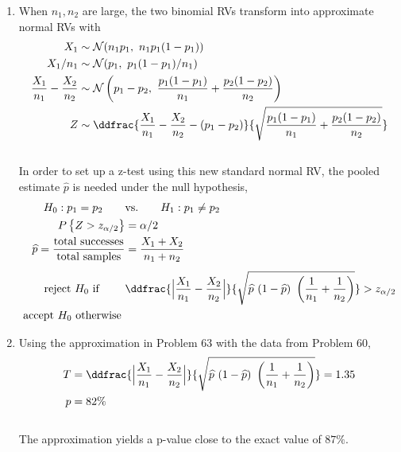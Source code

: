 \begin{enumerate}
	\item When $ n_1, n_2 $ are large, the two binomial RVs transform into approximate normal RVs with \\
	\begin{align}
		X_1 &\sim \mathcal{N}(n_1 p_1,\ n_1 p_1 (1-p_1)) \nonumber \\
		X_1 / n_1 &\sim \mathcal{N}(p_1,\ p_1 (1-p_1) / n_1) \nonumber \\
		\frac{X_1}{n_1} - \frac{X_2}{n_2} &\sim \mathcal{N}\left( p_1 - p_2,\ \frac{p_1(1-p_1)}{n_1} + \frac{p_2(1-p_2)}{n_2} \right) \\
		Z &\sim \ddfrac{\frac{X_1}{n_1} - \frac{X_2}{n_2} - (p_1 - p_2)}{\sqrt{\frac{p_1(1-p_1)}{n_1} + \frac{p_2(1-p_2)}{n_2}}}
	\end{align}\\

	In order to set up a z-test using this new standard normal RV, the pooled estimate $ \widehat{p} $ is needed under the null hypothesis, \\
	
	\begin{align}
		H_0 : p_1 = p_2 \qquad &\text{vs.} \qquad H_1 : p_1  \neq p_2 \nonumber \\
		P \left\{Z > z_{\alpha/2}\right\} &= \alpha/2 \nonumber \\
		\widehat{p} = \frac{\text{total successes}}{\text{total samples}} &= \frac{X_1 + X_2}{n_1 + n_2} \\[1ex]
		\text{reject $ H_0 $ if } \qquad & \ddfrac{\Big|\frac{X_1}{n_1} - \frac{X_2}{n_2}\Big|}{\sqrt{\widehat{p}\ (1 - \widehat{p})\ \left(\frac{1}{n_1} + \frac{1}{n_2}\right)}} > z_{\alpha/2} \nonumber \\
		\text{accept $ H_0 $ otherwise } 
	\end{align}

	\item Using the approximation in Problem 63 with the data from Problem 60, \\
	\begin{align}
		T &= \ddfrac{\Big|\frac{X_1}{n_1} - \frac{X_2}{n_2}\Big|}{\sqrt{\widehat{p}\ (1 - \widehat{p})\ \left(\frac{1}{n_1} + \frac{1}{n_2}\right)}} = 1.35 \\
		p &= 82\%
	\end{align}\\
	
	The approximation yields a p-value close to the exact value of $ 87\% $.\\
	

\end{enumerate}
